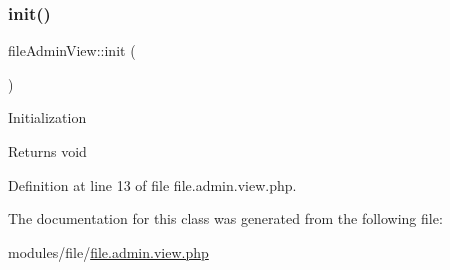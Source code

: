 \subsubsection{\texorpdfstring{init()}{init()}}
{\footnotesize\ttfamily file\+Admin\+View\+::init (\begin{DoxyParamCaption}{ }\end{DoxyParamCaption})}

Initialization \begin{DoxyReturn}{Returns}
void 
\end{DoxyReturn}


Definition at line 13 of file file.\+admin.\+view.\+php.



The documentation for this class was generated from the following file\+:\begin{DoxyCompactItemize}
\item 
modules/file/\hyperlink{file_8admin_8view_8php}{file.\+admin.\+view.\+php}\end{DoxyCompactItemize}
